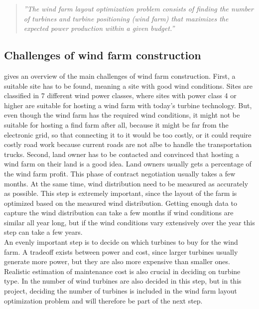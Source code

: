 \begin{quote}
\textit{''The wind farm layout optimization problem consists of finding the number of turbines and turbine positioning (wind farm) that maximizes the expected power production within a given budget.''}
\end{quote}


\subsection{Challenges of wind farm construction}
\cite{Samorani} gives an overview of the main challenges of wind farm construction. First, a suitable site has to be found, meaning a site with good wind conditions. Sites are classified in 7 different wind power classes, where sites with power class 4 or higher are suitable for hosting a wind farm with today's turbine technology. But, even though the wind farm has the required wind conditions, it might not be suitable for hosting a find farm after all, because it might be far from the electronic grid, so that connecting it to it would be too costly, or it could require costly road work because current roads are not albe to handle the transportation trucks. Second, land owner has to be contacted and convinced that hosting a wind farm on their land is a good idea. Land owners usually gets a percentage of the wind farm profit. This phase of contract negotiation  usually takes a few months. At the same time, wind distribution need to be measured as accurately as possible. This step is extremely important, since the layout of the farm is optimized based on the measured wind distribution. Getting enough data to capture the wind distribution can take a few months if wind conditions are similar all year long, but if the wind conditions vary extensively over the year this step can take a few years. \\

\noindent An evenly important step is to decide on which turbines to buy for the wind farm. A tradeoff exists between power and cost, since larger turbines usually generate more power, but they are also more expensive than smaller ones. Realistic estimation of maintenance cost is also crucial in deciding on turbine type. In \cite{Samorani} the number of wind turbines are also decided in this step, but in this project, deciding the number of turbines is included in the wind farm layout optimization problem and will therefore be part of the next step. \\


